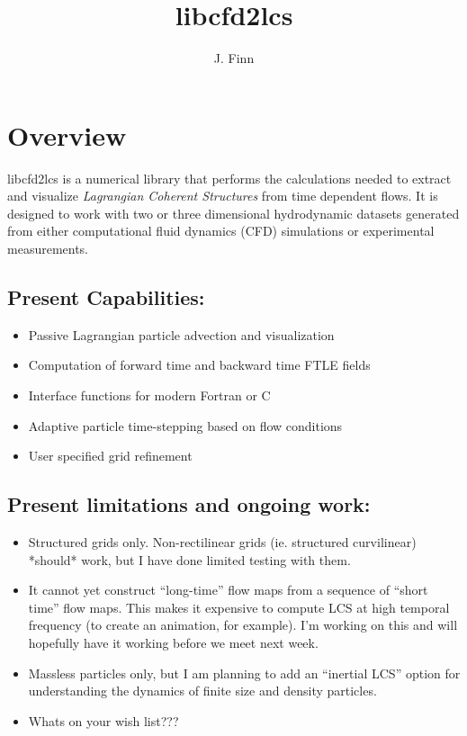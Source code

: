 \documentclass[a4paper,12pt]{article}
\title{libcfd2lcs}
\author{J. Finn}
\begin{document}
\maketitle
\section{Overview}
libcfd2lcs is a numerical library that performs the calculations needed to extract and visualize \emph{Lagrangian Coherent Structures} from time dependent flows.  It is designed to work with two or three dimensional hydrodynamic datasets generated from either computational fluid dynamics (CFD) simulations or experimental measurements.
\subsection*{Present Capabilities:}
\begin{itemize}
 \item Passive Lagrangian particle advection and visualization
 \item Computation of forward time and backward time FTLE fields
 \item Interface functions for modern Fortran or C
 \item Adaptive particle time-stepping based on flow conditions
 \item User specified grid refinement  
\end{itemize}
\subsection*{Present limitations and ongoing work:}
\begin{itemize}
 \item Structured grids only.  Non-rectilinear grids (ie. structured curvilinear) *should* work, but I have done limited testing with them.  
 \item It cannot yet construct ``long-time'' flow maps from a sequence of ``short time'' flow maps.  This makes it expensive to compute LCS at high temporal frequency (to create an animation, for example).  I'm working on this and will hopefully have it working before we meet next week.
 \item Massless particles only, but I am planning to add an ``inertial LCS'' option for understanding the dynamics of finite size and density particles.
 \item Whats on your wish list???
\end{itemize}
\end{document}
